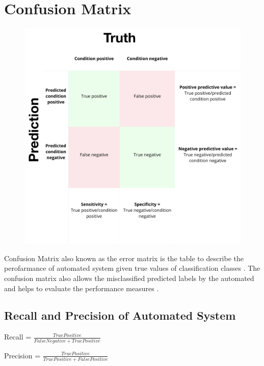 \section{Confusion Matrix}
\begin{figure}[!htp]
    \includegraphics[width=\textwidth]{Images/cm.png}
\end{figure}
Confusion Matrix also known as the error matrix is the table to describe the 
perofarmance of automated system given true values of classification classes \citep{geekforgeeks}. The 
confusion matrix also allows the misclassified predicted labels by the automated 
and helps to evaluate the performance measures \citep{geekforgeeks}.

\subsection{Recall and Precision of Automated System}
\begin{center}
    Recall = ${ \frac{True Positive} {False Negative + True Positive}}$
\end{center}

\begin{center}
    Precision = ${ \frac{True Positive} {True Positive + False Positive}}$
\end{center}


